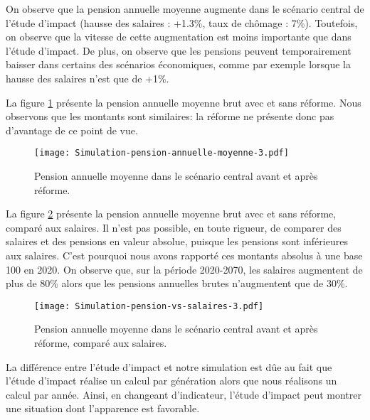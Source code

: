 \documentclass[10pt]{article}
\begin{document}
On observe que la pension annuelle moyenne augmente dans le scénario central de 
l'étude d'impact (hausse des salaires : +1.3\%, taux de chômage : 7\%). 
Toutefois, on observe que la vitesse de cette augmentation est moins importante 
que dans l'étude d'impact. 
De plus, on observe que les pensions peuvent temporairement baisser dans certains 
des scénarios économiques, comme par exemple lorsque la hausse des salaires n'est que 
de +1\%. 

La figure \ref{fig-pension-annuelle-simulation-vs-COR} présente la pension 
annuelle moyenne brut avec et sans réforme. 
Nous observons que les montants sont similaires: la réforme ne présente donc pas 
d'avantage de ce point de vue. 

\begin{figure}
\begin{center}
\texttt{[image: Simulation-pension-annuelle-moyenne-3.pdf]}
\end{center}
\caption{Pension annuelle moyenne dans le scénario central 
avant et après réforme.}
\label{fig-pension-annuelle-simulation-vs-COR}
\end{figure}

La figure \ref{fig-pension-annuelle-avant-apres-salaires} présente la pension 
annuelle moyenne brut avec et sans réforme, comparé aux salaires. 
Il n'est pas possible, en toute rigueur, de comparer des salaires et 
des pensions en valeur absolue, puisque les pensions sont inférieures aux 
salaires. 
C'est pourquoi nous avons rapporté ces montants absolus à une base 100 en 2020.  
On observe que, sur la période 2020-2070, les salaires augmentent de plus de 80\% 
alors que les pensions annuelles brutes n'augmentent que de 30\%. 

\begin{figure}
\begin{center}
\texttt{[image: Simulation-pension-vs-salaires-3.pdf]}
\end{center}
\caption{Pension annuelle moyenne dans le scénario central 
avant et après réforme, comparé aux salaires.}
\label{fig-pension-annuelle-avant-apres-salaires}
\end{figure}

La différence entre l'étude d'impact et notre simulation est dûe au fait que 
l'étude d'impact réalise un calcul par génération alors que nous réalisons un calcul 
par année. 
Ainsi, en changeant d'indicateur, l'étude d'impact peut montrer une situation 
dont l'apparence est favorable. 
\end{document}
